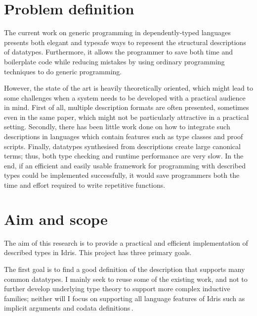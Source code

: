 \documentclass{ituthesis}
\theoremstyle{break}
\begin{document}


\section{Problem definition}
\label{sec:ProblemDefinition}
The current work on generic programming in dependently-typed languages presents both elegant and typesafe ways to represent the structural descriptions of datatypes.
Furthermore, it allows the programmer to save both time and boilerplate code while reducing mistakes by using ordinary programming techniques to do generic programming.

However, the state of the art is heavily theoretically oriented, which might lead to some challenges when a system needs to be developed with a practical audience in mind.
First of all, multiple description formats are often presented, sometimes even in the same paper, which might not be particularly attractive in a practical setting.
Secondly, there has been little work done on how to integrate such descriptions in languages which contain features such as type classes and proof scripts.
Finally, datatypes synthesised from descriptions create large canonical terms; thus, both type checking and runtime performance are very slow.
In the end, if an efficient and easily usable framework for programming with described types could be implemented successfully, it would save programmers both the time and effort required to write repetitive functions.

\section{Aim and scope}
\label{sec:AimandScope}
The aim of this research is to provide a practical and efficient implementation of described types in Idris.
This project has three primary goals.

The first goal is to find a good definition of the description that supports many common datatypes.
I mainly seek to reuse some of the existing work, and not to further develop underlying type theory to support more complex inductive families; neither will I focus on supporting all language features of Idris such as implicit arguments and codata definitions\,\autocite{idris2014tutorial}.
\end{document}
